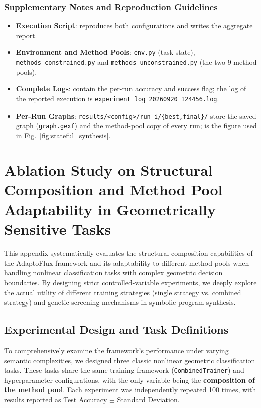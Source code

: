 \subsubsection{Supplementary Notes and Reproduction Guidelines}
\begin{itemize}
    \item \textbf{Execution Script}:  reproduces both configurations and writes the aggregate report.
    \item \textbf{Environment and Method Pools}: \texttt{env.py} (task state), \texttt{methods\_constrained.py} and \texttt{methods\_unconstrained.py} (the two 9-method pools).
    \item \textbf{Complete Logs}:  contain the per-run accuracy and success flag; the log of the reported execution is \texttt{experiment\_log\_20260920\_124456.log}.
    \item \textbf{Per-Run Graphs}: \texttt{results/\textless config\textgreater/run\_i/\{best,final\}/} store the saved graph (\texttt{graph.gexf}) and the method-pool copy of every run;  is the figure used in Fig.~\ref{fig:stateful_synthesis}.
\end{itemize}

\section{Ablation Study on Structural Composition and Method Pool Adaptability in Geometrically Sensitive Tasks}
\label{sec:appendix_geo_ablation}

This appendix systematically evaluates the structural composition capabilities of the AdaptoFlux framework and its adaptability to different method pools when handling nonlinear classification tasks with complex geometric decision boundaries. By designing strict controlled-variable experiments, we deeply explore the actual utility of different training strategies (single strategy vs. combined strategy) and genetic screening mechanisms in symbolic program synthesis.

\subsection{Experimental Design and Task Definitions}

To comprehensively examine the framework's performance under varying semantic complexities, we designed three classic nonlinear geometric classification tasks. These tasks share the same training framework (\texttt{CombinedTrainer}) and hyperparameter configurations, with the only variable being the \textbf{composition of the method pool}. Each experiment was independently repeated 100 times, with results reported as Test Accuracy $\pm$ Standard Deviation.

